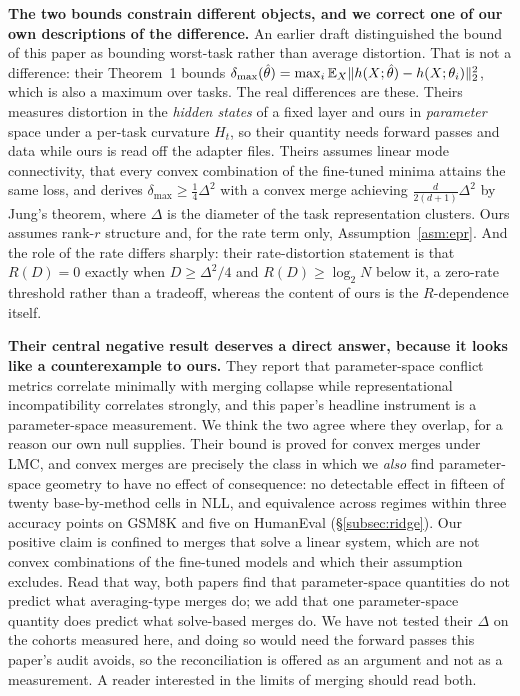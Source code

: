 \textbf{The two bounds constrain different objects, and we correct one
of our own descriptions of the difference.} An earlier draft distinguished
the bound of this paper as bounding worst-task rather than average distortion. That is not a difference:
their Theorem~1 bounds $\delta_{\max}(\hat\theta) = \max_i
\mathbb{E}_X\|h(X;\hat\theta) - h(X;\theta_i)\|_2^2$, which is also a maximum over
tasks. The real differences are these. Theirs measures distortion in the
\emph{hidden states} of a fixed layer and ours in \emph{parameter} space under
a per-task curvature $H_t$, so their quantity needs forward passes and data
while ours is read off the adapter files. Theirs assumes linear mode
connectivity, that every convex combination of the fine-tuned minima attains
the same loss, and derives $\delta_{\max} \geq \tfrac14\Delta^2$ with a convex
merge achieving $\tfrac{d}{2(d+1)}\Delta^2$ by Jung's theorem, where $\Delta$
is the diameter of the task representation clusters. Ours assumes rank-$r$
structure and, for the rate term only, Assumption~\ref{asm:epr}. And the role
of the rate differs sharply: their rate-distortion statement is that
$R(D) = 0$ exactly when $D \geq \Delta^2/4$ and $R(D) \geq \log_2 N$ below it,
a zero-rate threshold rather than a tradeoff, whereas the content of ours is
the $R$-dependence itself.

\textbf{Their central negative result deserves a direct answer, because it
looks like a counterexample to ours.} They report that parameter-space
conflict metrics correlate minimally with merging collapse while
representational incompatibility correlates strongly, and this paper's
headline instrument is a parameter-space measurement. We think the two agree
where they overlap, for a reason our own null supplies. Their bound is proved
for convex merges under LMC, and convex merges are precisely the class in
which we \emph{also} find parameter-space geometry to have no effect of
consequence: no detectable effect in fifteen of twenty base-by-method cells in
NLL, and equivalence across regimes within three accuracy points on GSM8K and
five on HumanEval (\S\ref{subsec:ridge}). Our positive
claim is confined to merges that solve a linear system, which are not convex
combinations of the fine-tuned models and which their assumption excludes.
Read that way, both papers find that parameter-space quantities do not predict
what averaging-type merges do; we add that one parameter-space quantity does
predict what solve-based merges do. We have not tested their $\Delta$
on the cohorts measured here, and doing so would need the forward passes this
paper's audit avoids, so the reconciliation is offered as an argument and not
as a measurement. A reader
interested in the limits of merging should read both.

